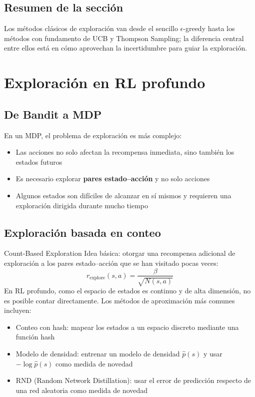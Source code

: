 \documentclass[a4paper]{article}
\begin{document}
\subsection{Resumen de la sección}

Los métodos clásicos de exploración van desde el sencillo $\epsilon$-greedy hasta los métodos con fundamento de UCB y Thompson Sampling; la diferencia central entre ellos está en cómo aprovechan la incertidumbre para guiar la exploración.
\section{Exploración en RL profundo}

\subsection{De Bandit a MDP}

En un MDP, el problema de exploración es más complejo:
\begin{itemize}
    \item Las acciones no solo afectan la recompensa inmediata, sino también los estados futuros
    \item Es necesario explorar \textbf{pares estado--acción} y no solo acciones
    \item Algunos estados son difíciles de alcanzar en sí mismos y requieren una exploración dirigida durante mucho tiempo
\end{itemize}

\subsection{Exploración basada en conteo}

\begin{importantbox}{Count-Based Exploration}
Idea básica: otorgar una recompensa adicional de exploración a los pares estado--acción que se han visitado pocas veces:
$$r_{\text{explore}}(s, a) = \frac{\beta}{\sqrt{N(s, a)}}$$
En RL profundo, como el espacio de estados es continuo y de alta dimensión, no es posible contar directamente. Los métodos de aproximación más comunes incluyen:
\begin{itemize}
    \item Conteo con hash: mapear los estados a un espacio discreto mediante una función hash
    \item Modelo de densidad: entrenar un modelo de densidad $\hat{p}(s)$ y usar $-\log \hat{p}(s)$ como medida de novedad
    \item RND (Random Network Distillation): usar el error de predicción respecto de una red aleatoria como medida de novedad
\end{itemize}
\end{importantbox}
\end{document}
